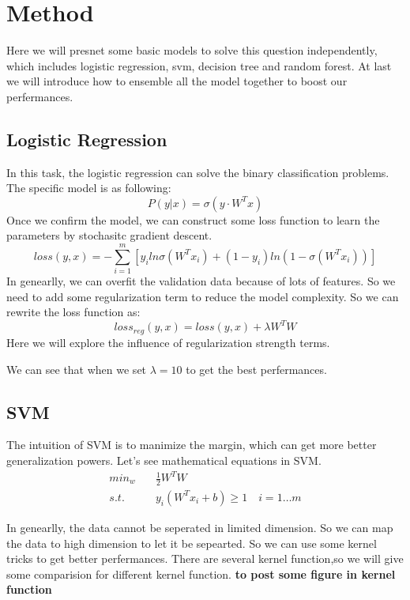 
\section{Method}
Here we will presnet some basic models to solve this question independently, which includes logistic regression, svm, decision tree and random forest. At last we will introduce how to ensemble all the model together to boost our perfermances.
\subsection{Logistic Regression}
In this task, the logistic regression can solve the binary classification problems. The specific model is as following:
\begin{equation}
    P(y|x) = \sigma(y\cdot W^Tx)
\end{equation}
Once we confirm the model, we can construct some loss function to learn the parameters by stochasitc gradient descent.
\begin{equation}
    loss(y, x) = -\sum_{i=1}^{m} [y_i ln\sigma(W^Tx_i)+(1-y_i)ln(1-\sigma(W^Tx_i))]
\end{equation}
In genearlly, we can overfit the validation data because of lots of features. So we need to add some regularization term to reduce the model complexity.
So we can rewrite the loss function as:
\begin{equation}
    loss_{reg}(y,x) = loss(y, x) + \lambda W^TW
\end{equation}
Here we will explore the influence of regularization strength terms. 

We can see that when we set $\lambda=10$ to get the best perfermances.

\subsection{SVM}
The intuition of SVM\cite{SVM} is to manimize the margin, which can get more better generalization powers. Let's see mathematical equations in SVM.
\begin{align}
    min_w & \quad \frac{1}{2} W^TW \\
    s.t. &\quad y_i(W^T x_i+b) \geq 1  \quad i = 1\dots m
\end{align}

In genearlly, the data cannot be seperated in limited dimension. So we can map the data to high dimension to let it be sepearted. So we can use some kernel tricks to get better perfermances. There are several kernel function,so we will give some comparision for different kernel function.
\textbf{to post some figure in kernel function}

